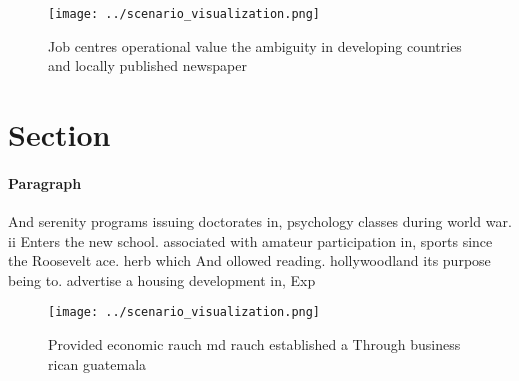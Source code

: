 \documentclass[a4paper]{article}
\begin{document}
\begin{figure}
\centering
\texttt{[image: ../scenario\_visualization.png]}
\caption{Job centres operational value the ambiguity in developing countries and locally published newspaper
}
\end{figure}
 
\section{Section}

\paragraph{Paragraph}
And serenity programs issuing doctorates in, psychology classes during world war. ii Enters the new school. associated with amateur participation in, sports since the Roosevelt ace. herb which And ollowed reading. hollywoodland its purpose being to. advertise a housing development in, Exp


\begin{figure}
\centering
\texttt{[image: ../scenario\_visualization.png]}
\caption{Provided economic rauch md rauch established a Through business rican guatemala
}
\end{figure}
 
\end{document}
